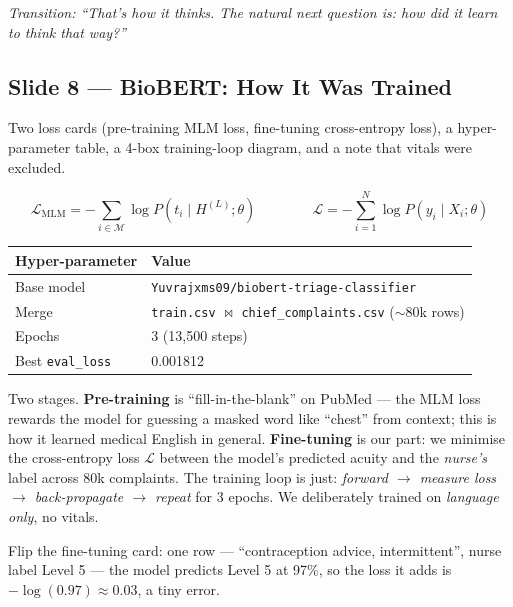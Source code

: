 \documentclass[11pt]{article}
\newcommand{\transition}[1]{\medskip\noindent\textit{\textcolor{mutel}{Transition: #1}}\medskip}
\newcommand{\route}[1]{{\small\texttt{\textcolor{mutel}{#1}}}}
\newcommand{\slide}[3]{%
  \subsection{Slide #1 --- #2}%
  \noindent\route{Route: #3}\par\smallskip}
\begin{document}
\transition{``That's how it thinks. The natural next question is: how did it \emph{learn} to think that way?''}

\slide{8}{BioBERT: How It Was Trained}{/dashboard/math/biobert-training}

\begin{onscreen}
Two loss cards (pre-training MLM loss, fine-tuning cross-entropy loss), a hyper-parameter table, a 4-box
training-loop diagram, and a note that vitals were excluded.
\end{onscreen}

\[
\mathcal{L}_{\mathrm{MLM}} = -\!\!\sum_{i\in\mathcal{M}}\!\log P(t_i\mid H^{(L)};\theta)
\qquad\qquad
\mathcal{L} = -\sum_{i=1}^{N}\log P(y_i\mid X_i;\theta)
\]

\begin{center}\small
\begin{tabular}{@{}ll@{}}
\toprule
\textbf{Hyper-parameter} & \textbf{Value}\\
\midrule
Base model    & \texttt{Yuvrajxms09/biobert-triage-classifier}\\
Merge         & \texttt{train.csv} $\bowtie$ \texttt{chief\_complaints.csv} ($\sim$80k rows)\\
Epochs        & 3 (13{,}500 steps)\\
Best \texttt{eval\_loss} & 0.001812\\
\bottomrule
\end{tabular}
\end{center}

\begin{idea}
Two stages. \textbf{Pre-training} is ``fill-in-the-blank'' on PubMed --- the MLM loss rewards the model
for guessing a masked word like ``chest'' from context; this is how it learned medical English in general.
\textbf{Fine-tuning} is our part: we minimise the cross-entropy loss $\mathcal{L}$ between the model's
predicted acuity and the \emph{nurse's} label across 80k complaints. The training loop is just:
\emph{forward $\rightarrow$ measure loss $\rightarrow$ back-propagate $\rightarrow$ repeat} for 3 epochs.
We deliberately trained on \emph{language only}, no vitals.
\end{idea}

\begin{demo}
Flip the fine-tuning card: one row --- ``contraception advice, intermittent'', nurse label Level 5 ---
the model predicts Level 5 at 97\%, so the loss it adds is $-\log(0.97)\approx0.03$, a tiny error.
\end{demo}
\end{document}
